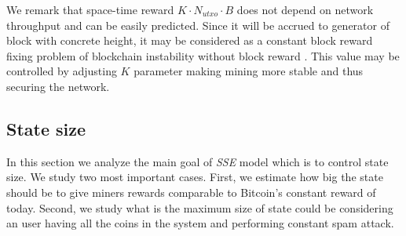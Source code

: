 \documentclass[]{article}   %
\newcommand{\authnote}[2]{\marginpar{\parbox{\marginparwidth}{\tiny %
  \textsf{#1 {\textcolor{blue}{notes: #2}}}}}%
  \textcolor{blue}{\textbf{\dag}}}
\newcommand{\authnote}[2]{
  \textsf{#1 \textcolor{blue}{: #2}}}
\newcommand{\authnote}[2]{}
\newcommand{\dnote}[1]{{\authnote{\textcolor{blue}{Dima notes}}{#1}}}
\newcommand{\esse}{\textit{SSE}}
\newcommand{\ignore}[1]{} %
\begin{document}
\ignore{
  \begin{equation}
  \label{eq:reward}
    M_{reward} \approx M_{pg} + (K \cdot B) \cdot ((1 + r_{flow}) \cdot N_{utxo} + r_{mode} \cdot N_{lost})
  \end{equation}

  First part of this equation $M_{pg}$ is the reward of miner in existing fee models, the rest is the unique reward for \esse{} model.  In a sensible assumption $N_{utxo} >> N_{lost}$ equation \ref{eq:reward} can be simplified to

  \begin{equation}
    M_{postpaid} \approx M_{pg} + K \cdot B \cdot N_{utxo} \cdot (1 + M)
  \end{equation}

  that allows to estimate such $K$, when additional \esse{} reward will exceed common propagation reward $M_{pg}$:

  \begin{equation}
    K = {M_{pg} \over B \cdot N_{utxo} \cdot (1 + M)} \approx 10^{-9} ({BTC / (Byte \cdot Block)})
  \end{equation}

  that is naturally coincide to estimations from section \ref{eq:ltmean} while miner reward equals to user losses.
}

We remark that space-time reward $K \cdot N_{utxo} \cdot B$ does not depend on network throughput and can be easily predicted. Since it will be accrued to generator of block with concrete height, it may be considered as a constant block reward fixing problem of blockchain instability without block reward \cite{carlsten2016instability}. This value may be controlled by adjusting $K$ parameter making mining more stable and thus securing the network.

\dnote{What is an output value when miner is interested in collecting it?}

\subsection{State size}

In this section we analyze the main goal of \esse{} model which is to control state size. We study two most important cases. First, we estimate how big the state should be to give miners rewards comparable to Bitcoin's constant reward of today. Second, we study what is the maximum size of state could be considering an user having all the coins in the system 
and performing constant spam attack.
\end{document}
